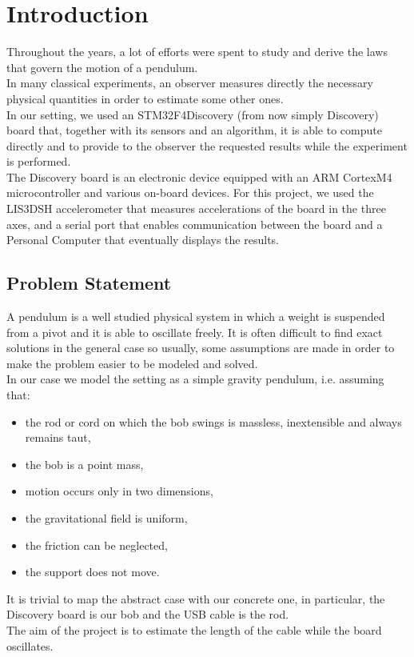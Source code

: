 \section{Introduction}
Throughout the years, a lot of efforts were spent to study and derive the laws that govern the motion of a pendulum. \\
In many classical experiments, an observer measures directly the necessary physical quantities in order to estimate some other ones. \\
In our setting, we used an STM32F4Discovery (from now simply Discovery) board that, together with its sensors and an algorithm, it is able to compute directly and to provide to the observer the requested results while the experiment is performed. \\
The Discovery board is an electronic device equipped with an ARM CortexM4 microcontroller and various on-board devices. For this project, we used the LIS3DSH accelerometer that measures accelerations of the board in the three axes, and a serial port that enables communication between the board and a Personal Computer that eventually displays the results. \\

\subsection{Problem Statement}
A pendulum is a well studied physical system in which a weight is suspended from a pivot and it is able to oscillate freely. It is often difficult to find exact solutions in the general case so usually, some assumptions are made in order to make the problem easier to be modeled and solved. \\
In our case we model the setting as a simple gravity pendulum, i.e. assuming that:
\begin{itemize}
	\item the rod or cord on which the bob swings is massless, inextensible and always remains taut,
	\item the bob is a point mass,
	\item motion occurs only in two dimensions,
	\item the gravitational field is uniform,
	\item the friction can be neglected,
	\item the support does not move.
\end{itemize}
It is trivial to map the abstract case with our concrete one, in particular, the Discovery board is our bob and the USB cable is the rod. \\
The aim of the project is to estimate the length of the cable while the board oscillates.
